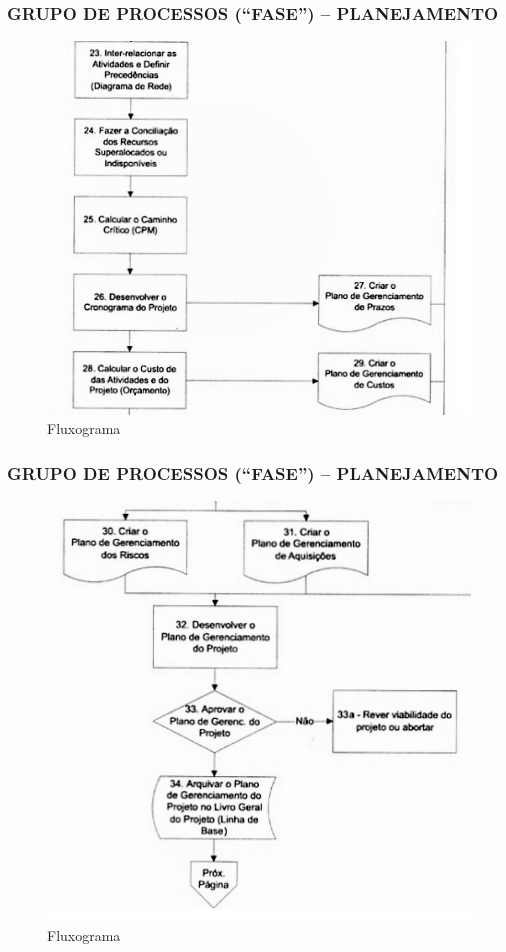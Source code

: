 \begin{frame}
 \frametitle{GRUPO DE PROCESSOS (“FASE”) – PLANEJAMENTO}
  \begin{figure}
   \centering
   \includegraphics[height = 0.9\textheight]{figs/fig16.png}
   \caption{Fluxograma}
  \end{figure}
\end{frame}
\begin{frame}
 \frametitle{GRUPO DE PROCESSOS (“FASE”) – PLANEJAMENTO}
  \begin{figure}
   \centering
   \includegraphics[height = 0.9\textheight]{figs/fig17.png}
   \caption{Fluxograma}
  \end{figure}
\end{frame}


